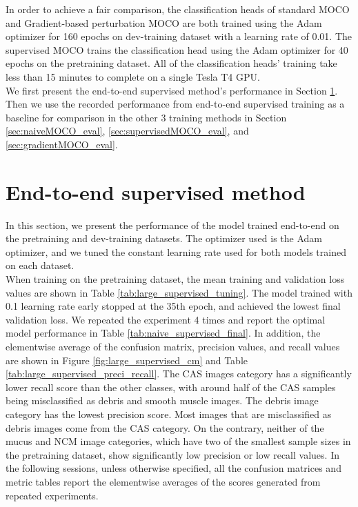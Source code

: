\documentclass[12pt,twoside]{report}
\begin{document}
In order to achieve a fair comparison, the classification heads of standard MOCO and Gradient-based perturbation MOCO are both trained using the Adam optimizer for 160 epochs on dev-training dataset with a learning rate of 0.01. The supervised MOCO trains the classification head using the Adam optimizer for 40 epochs on the pretraining dataset. All of the classification heads' training take less than 15 minutes to complete on a single Tesla T4 GPU. \\

We first present the end-to-end supervised method's performance in Section \ref{sec:end2end}. Then we use the recorded performance from end-to-end supervised training as a baseline for comparison in the other 3 training methods in Section \ref{sec:naiveMOCO_eval}, \ref{sec:supervisedMOCO_eval}, and \ref{sec:gradientMOCO_eval}. 

\section{End-to-end supervised method} \label{sec:end2end}
In this section, we present the performance of the model trained end-to-end on the pretraining and dev-training datasets. The optimizer used is the Adam optimizer, and we tuned the constant learning rate used for both models trained on each dataset. \\

When training on the pretraining dataset, the mean training and validation loss values are shown in Table \ref{tab:large_supervised_tuning}. The model trained with 0.1 learning rate early stopped at the 35th epoch, and achieved the lowest final validation loss. We repeated the experiment 4 times and report the optimal model performance in Table \ref{tab:naive_supervised_final}. In addition, the elementwise average of the confusion matrix, precision values, and recall values are shown in Figure \ref{fig:large_supervised_cm} and Table \ref{tab:large_supervised_preci_recall}. The CAS images category has a significantly lower recall score than the other classes, with around half of the CAS samples being misclassified as debris and smooth muscle images. The debris image category has the lowest precision score. Most images that are misclassified as debris images come from the CAS category. On the contrary, neither of the mucus and NCM image categories, which have two of the smallest sample sizes in the pretraining dataset, show significantly low precision or low recall values. In the following sessions, unless otherwise specified, all the confusion matrices and metric tables report the elementwise averages of the scores generated from repeated experiments.\\
\end{document}
